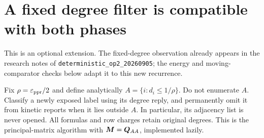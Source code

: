 \section{A fixed degree filter is compatible with both phases}
\label{sec:revisit-pruning}
This is an optional extension. The fixed-degree observation already appears
in the research notes of \texttt{deterministic\_op2\_20260905}; the energy
and moving-comparator checks below adapt it to this new recurrence.

Fix $\rho=\varepsilon_{\mathrm{ppr}}/2$ and define analytically
$A=\{i:d_i\leq1/\rho\}$. Do not enumerate $A$. Classify a newly exposed
label using its degree reply, and permanently omit it from kinetic reports
when it lies outside $A$. In particular, its adjacency list is never opened.
All formulas and row charges retain original degrees. This is the
principal-matrix algorithm with $\bm{M}=\bm{Q}_{AA}$, implemented lazily.

